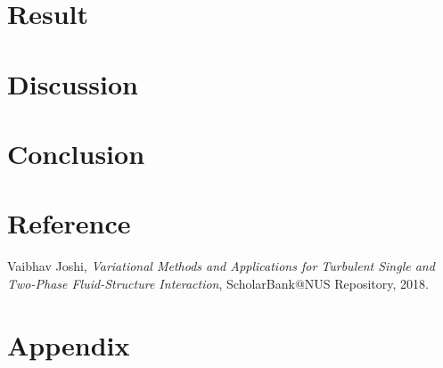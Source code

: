 \documentclass[12pt]{article} %
\begin{document}
\section{Result}

\section{Discussion}

\section{Conclusion}



\section{Reference}
\begin{thebibliography}{99}
    Vaibhav Joshi, \emph{Variational Methods and Applications for Turbulent Single and Two-Phase Fluid-Structure Interaction}, ScholarBank@NUS Repository, 2018.
\end{thebibliography}

\section{Appendix}
\end{document}
